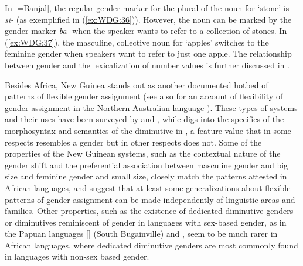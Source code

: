 \documentclass[output=collectionpaper]{langsci/langscibook}
\begin{document}
%

In  [=Banjal], the regular gender marker for the plural of the noun for `stone' is \textit{si-} (as exemplified in (\ref{ex:WDG:36})). However, the noun can be marked by the gender marker \textit{ba-} when the speaker wants to refer to a collection of stones. In  (\ref{ex:WDG:37}), the masculine, collective noun for `apples' switches to the feminine gender when speakers want to refer to just one apple. The relationship between gender and the lexicalization of number values is further discussed in .

Besides Africa, New Guinea stands out as another documented hotbed of patterns of flexible gender assignment (see also \citealt{Singer2018} for an account of flexibility of gender assignment in the Northern Australian language ). These types of systems and their uses have been surveyed by \cite{Aikhenvald2012} and , while  digs into the specifics of the morphosyntax and semantics of the diminutive in , a feature value that in some respects resembles a gender but in other respects does not. Some of the properties of the New Guinean systems, such as the contextual nature of the gender shift and the preferential association between masculine gender and big size and feminine gender and small size, closely match the patterns attested in African languages, and suggest that at least some generalizations about flexible patterns of gender assignment can be made independently of linguistic areas and families. Other properties, such as the existence of dedicated diminutive genders or diminutives reminiscent of gender in languages with sex-based gender, as in the Papuan languages  [] (South Bugainville) and , seem to be much rarer in African languages, where dedicated diminutive genders are most commonly found in languages with non-sex based gender.
\end{document}
